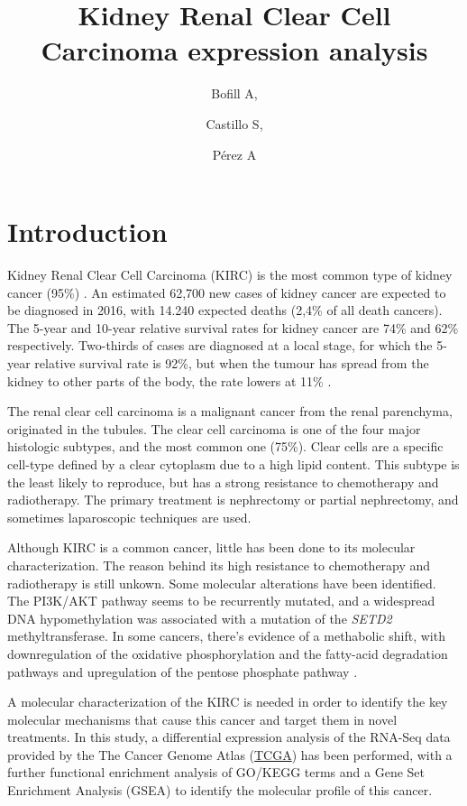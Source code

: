 \documentclass[9pt,twocolumn,twoside]{gsajnl}
\title{Kidney Renal Clear Cell Carcinoma expression analysis}
\author[$\ast$1]{Bofill A,}
\author[$\ast$1]{Castillo S,}
\author[$\ast$1]{Pérez A}
\affil[$\ast$]{Msc in Bioinformatics for Health Sciences, Pompeu Fabra University}
\begin{document}
\maketitle
\thispagestyle{firststyle}
\firstpagefootnote
{}
\vspace{-11pt}%


\section*{Introduction}

Kidney Renal Clear Cell Carcinoma (KIRC) is the most common type of kidney cancer (95\%) \citep{SEER}.  An estimated 62,700 new cases of kidney cancer are expected to be diagnosed in 2016, with 14.240 expected deaths (2,4\% of all death cancers).   The  5-year  and  10-year  relative  survival  rates  for  kidney  
cancer are 74\% and 62\% respectively.  Two-thirds of cases 
 are diagnosed at a local stage, for which the 5-year relative 
survival  rate  is  92\%, but when the tumour has spread from the kidney to other parts of the body, the rate lowers at 11\% \citep{SEER}. 


The renal clear cell carcinoma is a malignant cancer from the renal parenchyma, originated in the tubules. The clear cell carcinoma is one of the four major histologic subtypes, and the most common one (75\%). Clear cells are a specific cell-type defined by a clear cytoplasm due to a high lipid content. This subtype is the least likely to reproduce, but has a strong resistance to chemotherapy and radiotherapy. The primary treatment is nephrectomy or partial nephrectomy, and sometimes laparoscopic techniques are used. 
	

Although KIRC is a common cancer, little has been done to its molecular characterization. The reason behind its high resistance to chemotherapy and radiotherapy is still unkown. Some molecular alterations have been identified. The PI3K/AKT pathway seems to be recurrently mutated, and a widespread DNA hypomethylation was associated with a mutation of the \textit{SETD2} methyltransferase. In some cancers, there's evidence of a methabolic shift, with downregulation of the oxidative phosphorylation  and the fatty-acid degradation pathways and upregulation of the pentose phosphate pathway \citep{Creighton2013}.

A molecular characterization of the KIRC is needed in order to identify the key molecular mechanisms that cause this cancer and target them in novel treatments. In this study,  a differential expression analysis of the RNA-Seq data provided by the The Cancer Genome Atlas (\href{http://www.cancergenome.nih.gov}{TCGA}) has been performed, with a further functional enrichment analysis of GO/KEGG terms and a Gene Set Enrichment Analysis (GSEA) to identify the molecular profile of this cancer.
\end{document}
